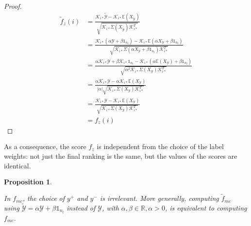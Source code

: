\documentclass[12pt]{article}  %
\newtheorem{property}{Proposition}
\begin{document}
\begin{proof}
\begin{equation*}
\begin{split}
\tilde{f}_{z}(i) 
&= \frac{\mathcal{K}_{i*} \tilde{\mathcal{Y}} - \mathcal{K}_{i*} \mathds{E}(X_{\tilde{\mathcal{Y}}})}{ \sqrt{ \mathcal{K}_{i*}\Sigma(X_{\tilde{\mathcal{Y}}}) \mathcal{K}_{i*}^T} } \\
&= \frac{\mathcal{K}_{i*} (\alpha \mathcal{Y} + \beta\mathbb{1}_{n_l})- \mathcal{K}_{i*} \mathds{E}(\alpha X_{\mathcal{Y}} + \beta\mathbb{1}_{n_l})}{\sqrt{ \mathcal{K}_{i*} \Sigma(\alpha X_{\mathcal{Y}} + \beta\mathbb{1}_{n_l}) \mathcal{K}_{i*}^T}} \\
&= \frac{\alpha \mathcal{K}_{i*} \mathcal{Y} + \beta \mathcal{K}_{i*} \mathbb{1}_{n_l}- \mathcal{K}_{i*} (\alpha\mathds{E}(X_{\mathcal{Y}}) + \beta\mathbb{1}_{n_l})}{\sqrt{\alpha^2 \mathcal{K}_{i*}\Sigma(X_{\mathcal{Y}}) \mathcal{K}_{i*}^T}} \\
&= \frac{\alpha \mathcal{K}_{i*} \mathcal{Y} - \alpha \mathcal{K}_{i*} \mathds{E}(X_{\mathcal{Y}})}{|\alpha|\sqrt{\mathcal{K}_{i*}\Sigma(X_{\mathcal{Y}}) \mathcal{K}_{i*}^T}} \\
&= \frac{\mathcal{K}_{i*} \mathcal{Y} - \mathcal{K}_{i*} \mathds{E}(X_{\mathcal{Y}})}{\sqrt{\mathcal{K}_{i*}\Sigma(X_{\mathcal{Y}}) \mathcal{K}_{i*}^T}} \\
&= f_z(i)
\end{split}
\end{equation*}

\end{proof}

As a consequence, the score $f_z$ is independent from the choice of the label weights: not just the final ranking is the same, but the values of the scores are identical. 


\begin{property}
\label{prop:mc}

In $f_{mc}$, the choice of $y^{+}$ and $y^{-}$ is irrelevant. 
More generally, computing $\tilde{f}_{mc}$ using $\tilde{\mathcal{Y}} = \alpha \mathcal{Y} + \beta\mathbb{1}_{n_l}$ instead of $\mathcal{Y}$, with $\alpha, \beta \in \mathds{R}, \alpha > 0$, is equivalent to computing $f_{mc}$. 

\end{property}
\end{document}
